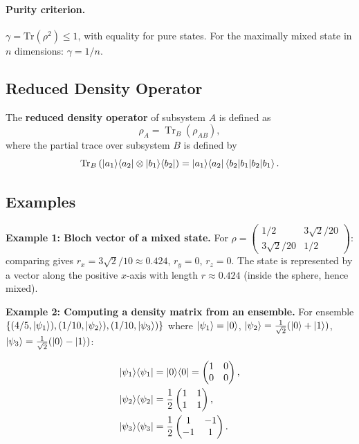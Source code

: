 \documentclass[10pt,a4paper]{article}
\begin{document}
\paragraph{Purity criterion.} $\gamma=\mathrm{Tr}(\rho^2)\le 1$, with equality for pure states. For the maximally mixed state in $n$ dimensions: $\gamma=1/n$.

\subsection{Reduced Density Operator}

\begin{tcolorbox}[defstyle, title={Definition}]
The \textbf{reduced density operator} of subsystem \(A\) is defined as
\[
\rho_A=\operatorname{Tr}_B(\rho_{AB}),
\]
where the partial trace over subsystem \(B\) is defined by
\[
\operatorname{Tr}_B
\left(
\ket{a_1}\!\bra{a_2}\otimes\ket{b_1}\!\bra{b_2}
\right)
=
\ket{a_1}\!\bra{a_2}\braket{b_2|b_1}.
\]
\end{tcolorbox}

\subsection{Examples}

\textbf{Example 1: Bloch vector of a mixed state.}
For $\rho=\begin{pmatrix}1/2 & 3\sqrt{2}/20\\3\sqrt{2}/20 & 1/2\end{pmatrix}$: comparing gives $r_x=3\sqrt{2}/10\approx 0.424$, $r_y=0$, $r_z=0$. The state is represented by a vector along the positive $x$-axis with length $r\approx 0.424$ (inside the sphere, hence mixed).

\textbf{Example 2: Computing a density matrix from an ensemble.}
For ensemble $\{(4/5,\ket{\psi_1}),(1/10,\ket{\psi_2}),(1/10,\ket{\psi_3})\}$ where $\ket{\psi_1}=\ket{0}$, $\ket{\psi_2}=\frac{1}{\sqrt{2}}(\ket{0}+\ket{1})$, $\ket{\psi_3}=\frac{1}{\sqrt{2}}(\ket{0}-\ket{1})$:

\begin{align*}
\ket{\psi_1}\!\bra{\psi_1}&=\ket{0}\!\bra{0}=\begin{pmatrix}1&0\\0&0\end{pmatrix},\\
\ket{\psi_2}\!\bra{\psi_2}&=\frac{1}{2}\begin{pmatrix}1&1\\1&1\end{pmatrix},\\
\ket{\psi_3}\!\bra{\psi_3}&=\frac{1}{2}\begin{pmatrix}1&-1\\-1&1\end{pmatrix}.
\end{align*}
\end{document}
